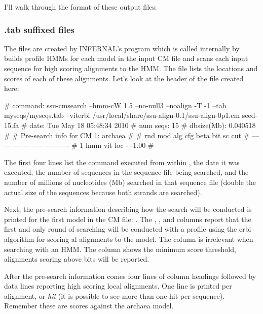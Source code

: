 I'll walk through the format of these output files:

\subsubsection{.tab suffixed files}

The  files are created by INFERNAL's
 program which is called internally by
.  builds profile HMMs for each model
in the input CM file and scans each input sequence for high scoring
alignments to the HMM\@. The  file lists the locations and
scores of each of these alignments. Let's look at the header of the 
 file created here:

\begin{sreoutput}
# command:    ssu-cmsearch --hmm-cW 1.5 --no-null3 --noalign -T -1 --tab myseqs/myseqs.tab --viterbi 
/usr/local/share/ssu-align-0.1/ssu-align-0p1.cm seed-15.fa
# date:       Tue May 18 05:48:34 2010
# num seqs:   15
# dbsize(Mb): 0.040518
#
# Pre-search info for CM 1: archaea
#
# rnd  mod  alg  cfg   beta  bit sc cut
# ---  ---  ---  ---  -----  ----------
#   1  hmm  vit  loc      -       -1.00
#
\end{sreoutput}

The first four lines list the  command executed from
within , the date it was executed, the number of
sequences in the sequence file being searched, and the number of
millions of nucleotides (Mb) searched in that sequence file (double the
actual size of the sequences because both strands are searched).

Next, the pre-search information describing how the search will be
conducted is printed for the first model in the CM file: . 
The , ,  and  columns report
that the first and only round of searching will be conducted with a
profile  using the erbi algorithm for scoring
al alignments to the model. The 
column is irrelevant when searching with an HMM\@. The 
column shows the minimum score threshold, alignments scoring above
 bits will be reported.

After the pre-search information comes four lines of column headings
followed by data lines reporting high scoring local alignments. One
line is printed per alignment, or \emph{hit} (it is possible to see
more than one hit per sequence). Remember these are scores against the
archaea model.

